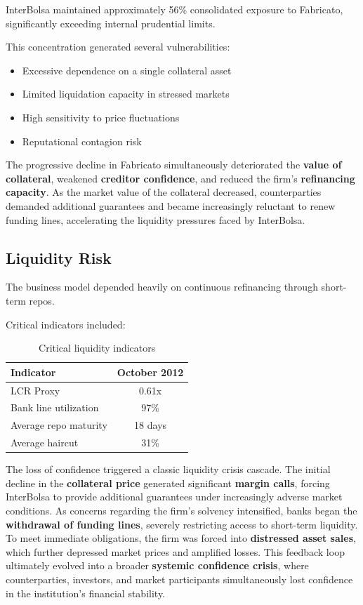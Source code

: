 InterBolsa maintained approximately 56\% consolidated exposure to Fabricato, significantly exceeding internal prudential limits.

This concentration generated several vulnerabilities:

\begin{itemize}
    \item Excessive dependence on a single collateral asset
    \item Limited liquidation capacity in stressed markets
    \item High sensitivity to price fluctuations
    \item Reputational contagion risk
\end{itemize}

The progressive decline in Fabricato simultaneously deteriorated the \textbf{value of collateral}, weakened \textbf{creditor confidence}, and reduced the firm's \textbf{refinancing capacity}. As the market value of the collateral decreased, counterparties demanded additional guarantees and became increasingly reluctant to renew funding lines, accelerating the liquidity pressures faced by InterBolsa.

\vspace{0.3cm}

\subsection{Liquidity Risk}

The business model depended heavily on continuous refinancing through short-term repos.

Critical indicators included:

\begin{table}[h!]
\centering
\begin{tabular}{|l|c|}
\hline
\textbf{Indicator} & \textbf{October 2012} \\ \hline
LCR Proxy & 0.61x \\ \hline
Bank line utilization & 97\% \\ \hline
Average repo maturity & 18 days \\ \hline
Average haircut & 31\% \\ \hline
\end{tabular}
\caption{Critical liquidity indicators}
\end{table}

The loss of confidence triggered a classic liquidity crisis cascade. The initial decline in the \textbf{collateral price} generated significant \textbf{margin calls}, forcing InterBolsa to provide additional guarantees under increasingly adverse market conditions. As concerns regarding the firm's solvency intensified, banks began the \textbf{withdrawal of funding lines}, severely restricting access to short-term liquidity. To meet immediate obligations, the firm was forced into \textbf{distressed asset sales}, which further depressed market prices and amplified losses. This feedback loop ultimately evolved into a broader \textbf{systemic confidence crisis}, where counterparties, investors, and market participants simultaneously lost confidence in the institution's financial stability.

